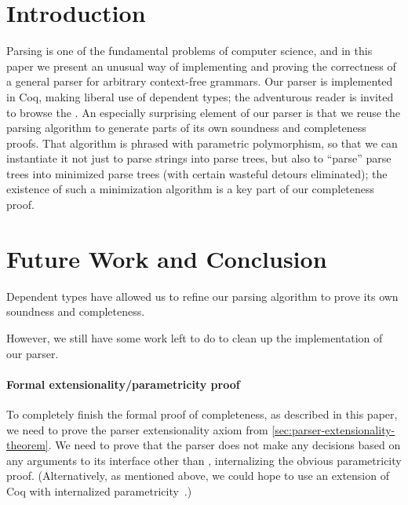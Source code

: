 \section{Introduction} \label{sec:intro}
  Parsing is one of the fundamental problems of computer science, and in this paper we present an unusual way of implementing and proving the correctness of a general parser for arbitrary context-free grammars.  Our parser is implemented in Coq, making liberal use of dependent types; the adventurous reader is invited to browse the
  \hyperref[sec:intro]{\hphantom{included source code}}%
  .  An especially surprising element of our parser is that we reuse the parsing algorithm to generate parts of its own soundness and completeness proofs.  That algorithm is phrased with parametric polymorphism, so that we can instantiate it not just to parse strings into parse trees, but also to ``parse'' parse trees into minimized parse trees (with certain wasteful detours eliminated); the existence of such a minimization algorithm is a key part of our completeness proof.

  












\section{Future Work and Conclusion} \label{sec:conclusion}
  Dependent types have allowed us to refine our parsing algorithm to prove its own soundness and completeness.

  However, we still have some work left to do to clean up the implementation of our parser.

  \paragraph{Formal extensionality/parametricity proof}
    To completely finish the formal proof of completeness, as described in this paper, we need to prove the parser extensionality axiom from \autoref{sec:parser-extensionality-theorem}.  We need to prove that the parser does not make any decisions based on any arguments to its interface other than , internalizing the obvious parametricity proof.  (Alternatively, as mentioned above, we could hope to use an extension of Coq with internalized parametricity~\cite{InColor}.)

